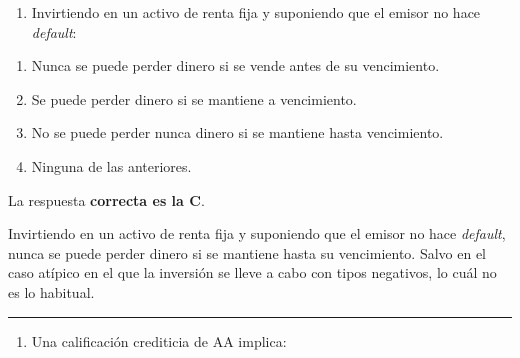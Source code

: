 \documentclass[
  letterpaper,
  DIV=11,
  numbers=noendperiod]{scrreprt}
\providecommand{\tightlist}{%
  \setlength{\itemsep}{0pt}\setlength{\parskip}{0pt}}\usepackage{longtable,booktabs,array}
\begin{document}
\begin{enumerate}
\def\labelenumi{\arabic{enumi}.}
\setcounter{enumi}{97}
\tightlist
\item
  Invirtiendo en un activo de renta fija y suponiendo que el emisor no
  hace \emph{default}:
\end{enumerate}

\begin{enumerate}
\def\labelenumi{\alph{enumi})}
\item
  Nunca se puede perder dinero si se vende antes de su vencimiento.
\item
  Se puede perder dinero si se mantiene a vencimiento.
\item
  No se puede perder nunca dinero si se mantiene hasta vencimiento.
\item
  Ninguna de las anteriores.
\end{enumerate}

\begin{tcolorbox}[enhanced jigsaw, left=2mm, opacityback=0, colback=white, breakable, arc=.35mm, bottomrule=.15mm, rightrule=.15mm, toprule=.15mm, leftrule=.75mm, colframe=quarto-callout-tip-color-frame]
\begin{minipage}[t]{5.5mm}
\textcolor{quarto-callout-tip-color}{\faLightbulb}
\end{minipage}%
\begin{minipage}[t]{\textwidth - 5.5mm}

La respuesta \textbf{correcta es la C}.

Invirtiendo en un activo de renta fija y suponiendo que el emisor no
hace \emph{default}, nunca se puede perder dinero si se mantiene hasta
su vencimiento. Salvo en el caso atípico en el que la inversión se lleve
a cabo con tipos negativos, lo cuál no es lo habitual.

\end{minipage}%
\end{tcolorbox}

\begin{center}\rule{0.5\linewidth}{0.5pt}\end{center}

\begin{enumerate}
\def\labelenumi{\arabic{enumi}.}
\setcounter{enumi}{98}
\tightlist
\item
  Una calificación crediticia de AA implica:
\end{enumerate}
\end{document}
